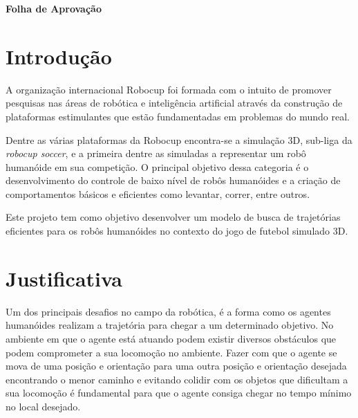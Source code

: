 \documentclass[font=plain]{abnt}
\begin{document}
\capa
\folhaderosto

\begin{folhadeaprovacao}
\begin{center}
\large
\textbf{Folha de Aprovação}
\end{center}

\setlength{\ABNTsignthickness}{0.4pt}
\setlength{\ABNTsignskip}{2cm}
\hspace*{1cm}
\end{folhadeaprovacao}

\chapter{Introdução}

A organização internacional Robocup foi formada com o intuito de promover pesquisas nas áreas de robótica e inteligência artificial
através da construção de plataformas estimulantes que estão fundamentadas em problemas do mundo real.

Dentre as várias plataformas da Robocup encontra-se a simulação 3D, sub-liga da \textit{robocup soccer}, e a primeira dentre as simuladas 
a representar um robô humanóide em sua competição. O principal objetivo dessa categoria é o desenvolvimento do controle de baixo nível de
robôs humanóides e a criação de comportamentos básicos e eficientes como levantar, correr, entre outros.\cite{SimulationLeague}

Este projeto tem como objetivo desenvolver um modelo de busca de trajetórias eficientes para os robôs humanóides no contexto do jogo 
de futebol simulado 3D. 

\chapter{Justificativa}
Um dos principais desafios no campo da robótica, é a forma como os agentes humanóides realizam a trajetória para chegar a 
um determinado objetivo. No ambiente em que o agente está atuando podem existir diversos obstáculos que podem comprometer 
a sua locomoção no ambiente. Fazer com que o agente se mova de uma posição e orientação para uma outra posição e orientação
desejada encontrando o menor caminho e evitando colidir com os objetos que dificultam a sua locomoção é fundamental para que
o agente consiga chegar no tempo mínimo no local desejado.
\end{document}
